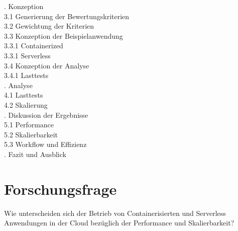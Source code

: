 \begin{otherlanguage}{american}
. Konzeption\\
\hspace*{0.5cm}3.1 Generierung der Bewertungskriterien\\
\hspace*{0.5cm}3.2 Gewichtung der Kriterien\\
\hspace*{0.5cm}3.3 Konzeption der Beispielanwendung\\
\hspace*{1cm}3.3.1 Containerized\\
\hspace*{1cm}3.3.1 Serverless\\
\hspace*{0.5cm}3.4 Konzeption der Analyse\\
\hspace*{1cm}3.4.1 Lasttests\\

. Analyse\\
\hspace*{0.5cm}4.1 Lasttests\\
\hspace*{0.5cm}4.2 Skalierung\\

. Diskussion der Ergebnisse\\
\hspace*{0.5cm}5.1 Performance\\
\hspace*{0.5cm}5.2 Skalierbarkeit\\
\hspace*{0.5cm}5.3 Workflow und Effizienz\\

. Fazit und Ausblick

\section{Forschungsfrage}
Wie unterscheiden sich der Betrieb von Containerisierten und Serverless Anwendungen in der Cloud bezüglich der Performance und Skalierbarkeit?
\end{otherlanguage}
